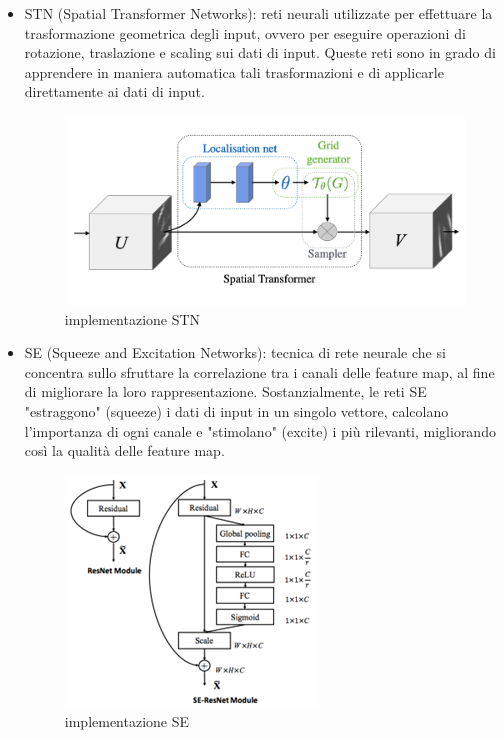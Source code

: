 \begin{itemize}
    \item STN (Spatial Transformer Networks): reti neurali utilizzate per effettuare la trasformazione geometrica degli input, ovvero per eseguire operazioni di rotazione, traslazione e scaling sui dati di input. Queste reti sono in grado di apprendere in maniera automatica tali trasformazioni e di applicarle direttamente ai dati di input.
    \begin{figure}
        \begin{center}    
            \includegraphics[width=0.9\linewidth]{images/5.png}
            \caption{implementazione STN}
        \end{center}
    \end{figure}
    \item SE (Squeeze and Excitation Networks): tecnica di rete neurale che si concentra sullo sfruttare la correlazione tra i canali delle feature map, al fine di migliorare la loro rappresentazione. Sostanzialmente, le reti SE "estraggono" (squeeze) i dati di input in un singolo vettore, calcolano l'importanza di ogni canale e "stimolano" (excite) i più rilevanti, migliorando così la qualità delle feature map.
    \begin{figure}
        \begin{center}    
            \includegraphics[width=0.5\linewidth]{images/6.png}
            \caption{implementazione SE}

\end{center}
\end{figure}
\end{itemize}
